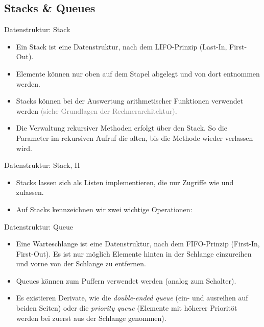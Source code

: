 \subsection{Stacks \& Queues}

\begin{frame}{Datenstruktur: Stack}
    \hypertarget<1>{mrk:Stack}{}%
    \begin{itemize}[<+(1)->]
        \widei
        \item Ein Stack ist eine Datenstruktur, nach dem LIFO-Prinzip (Last-In, First-Out).
        \item Elemente können nur oben auf dem Stapel abgelegt und von dort entnommen werden.
        \item Stacks können bei der Auswertung arithmetischer Funktionen verwendet werden \textcolor{gray}{(siehe Grundlagen der Rechnerarchitektur)}.
        \item Die Verwaltung rekursiver Methoden erfolgt über den Stack. So  die Parameter im rekursiven Aufruf die alten, bis die Methode wieder verlassen wird.
    \end{itemize}
\end{frame}

\begin{frame}{Datenstruktur: Stack, II}
    \begin{itemize}[<+(1)->]
        \widei
        \item Stacks lassen sich als Listen implementieren,\pause{} die nur Zugriffe wie  und  zulassen.
        \item Auf Stacks kennzeichnen wir zwei wichtige Operationen: 
    \end{itemize}
\end{frame}

\begin{frame}{Datenstruktur: Queue}
    \begin{itemize}[<+(1)->]
        \widei
        \item Eine Warteschlange ist eine Datenstruktur, nach dem FIFO-Prinzip (First-In, First-Out).\pause{} Es ist nur möglich Elemente hinten in der Schlange einzureihen und vorne von der Schlange zu entfernen.
        \item Queues können zum Puffern verwendet werden (analog zum Schalter).
        \item Es existieren Derivate, wie die \emph{double-ended queue} (ein- und ausreihen auf beiden Seiten) oder die \emph{priority queue} (Elemente mit höherer Prioritöt werden bei  zuerst aus der Schlange genommen).
    \end{itemize}
\end{frame}


